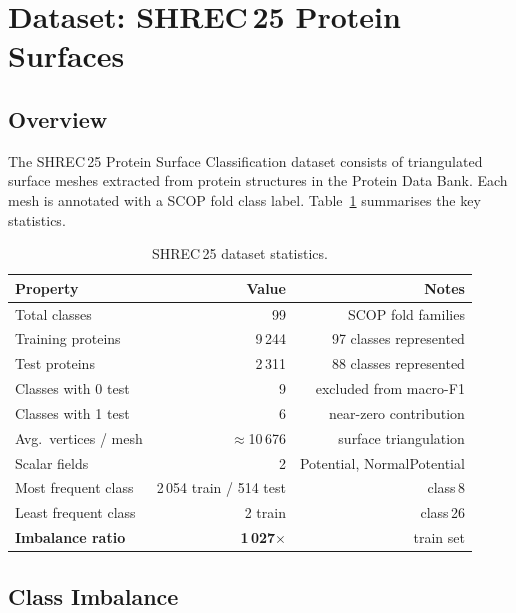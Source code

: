 \section{Dataset: SHREC\,25 Protein Surfaces}
\label{sec:dataset}

\subsection{Overview}

The SHREC\,25 Protein Surface Classification dataset consists of triangulated
surface meshes extracted from protein structures in the Protein Data Bank.
Each mesh is annotated with a SCOP fold class label.
Table~\ref{tab:dataset_stats} summarises the key statistics.

\begin{table}[h]
  \centering
  \caption{SHREC\,25 dataset statistics.}
  \label{tab:dataset_stats}
  \begin{tabular}{lrr}
    \toprule
    \textbf{Property} & \textbf{Value} & \textbf{Notes} \\
    \midrule
    Total classes          & 99  & SCOP fold families \\
    Training proteins      & 9\,244  & 97 classes represented \\
    Test proteins          & 2\,311  & 88 classes represented \\
    Classes with 0 test    & 9   & excluded from macro-F1 \\
    Classes with 1 test    & 6   & near-zero contribution \\
    \midrule
    Avg.\ vertices / mesh  & $\approx$10\,676 & surface triangulation \\
    Scalar fields          & 2   & Potential, NormalPotential \\
    \midrule
    Most frequent class    & 2\,054 train / 514 test & class\,8 \\
    Least frequent class   & 2 train & class\,26 \\
    \textbf{Imbalance ratio} & \textbf{1\,027$\times$} & train set \\
    \bottomrule
  \end{tabular}
\end{table}

\subsection{Class Imbalance}

